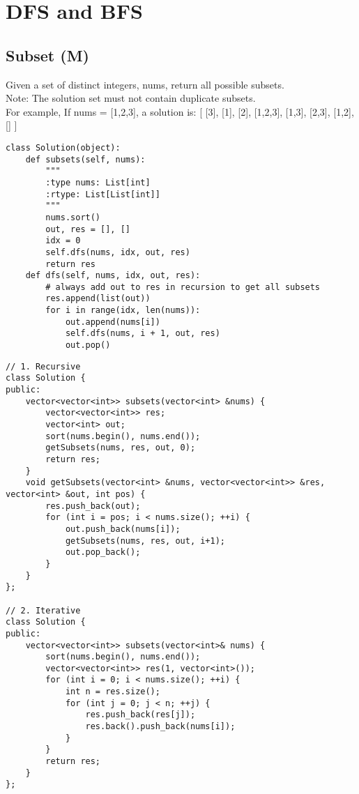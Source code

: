 \chapter{DFS and BFS}
\section{Subset (M)}
Given a set of distinct integers, nums, return all possible subsets.\\
Note: The solution set must not contain duplicate subsets.\\
For example,
If nums = [1,2,3], a solution is:
[
  [3],
  [1],
  [2],
  [1,2,3],
  [1,3],
  [2,3],
  [1,2],
  []
]\\

\begin{lstlisting}
class Solution(object):
    def subsets(self, nums):
        """
        :type nums: List[int]
        :rtype: List[List[int]]
        """
        nums.sort()
        out, res = [], []
        idx = 0
        self.dfs(nums, idx, out, res)
        return res
    def dfs(self, nums, idx, out, res):
        # always add out to res in recursion to get all subsets
        res.append(list(out))
        for i in range(idx, len(nums)):
            out.append(nums[i])
            self.dfs(nums, i + 1, out, res)
            out.pop()
\end{lstlisting}

\begin{lstlisting}
// 1. Recursive
class Solution {
public:
    vector<vector<int>> subsets(vector<int> &nums) {
        vector<vector<int>> res;
        vector<int> out;
        sort(nums.begin(), nums.end());
        getSubsets(nums, res, out, 0);
        return res;
    }
    void getSubsets(vector<int> &nums, vector<vector<int>> &res, vector<int> &out, int pos) {
        res.push_back(out);
        for (int i = pos; i < nums.size(); ++i) {
            out.push_back(nums[i]);
            getSubsets(nums, res, out, i+1);
            out.pop_back();
        }
    }
};

// 2. Iterative
class Solution {
public:
    vector<vector<int>> subsets(vector<int>& nums) {
        sort(nums.begin(), nums.end());
        vector<vector<int>> res(1, vector<int>());
        for (int i = 0; i < nums.size(); ++i) {
            int n = res.size();
            for (int j = 0; j < n; ++j) {
                res.push_back(res[j]);
                res.back().push_back(nums[i]);
            }
        }
        return res;
    }
};
\end{lstlisting}


